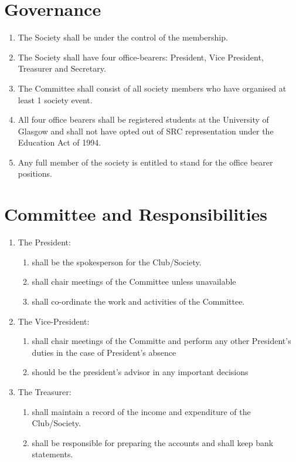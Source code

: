 \documentclass{report}
\newcommand{\bearersNo}{four}
\begin{document}
\section{Governance}

	\begin{enumerate}
		\item{The Society shall be under the control of the membership.}
		\item{The Society shall have \bearersNo{} office-bearers: President, Vice President, Treasurer and Secretary.}
		\item{The Committee shall consist of all society members who have organised at least 1 society event.}
		\item{All \bearersNo{} office bearers shall be registered students at the University of Glasgow and shall not have opted out of SRC representation under the Education Act of 1994.}
		\item{Any full member of the society is entitled to stand for the office bearer positions.}
	\end{enumerate}
	
\section{Committee and Responsibilities}

	\begin{enumerate}
		\item{The President:
			\begin{enumerate}
				\item{shall be the spokesperson for the Club/Society.}
				\item{shall chair meetings of the Committee unless unavailable }
				\item{shall co-ordinate the work and activities of the Committee.}
			\end{enumerate}
		}
		\item{The Vice-President:
			\begin{enumerate}
				\item{shall chair meetings of the Committe and perform any other President’s duties in the case of President's absence}
				\item{should be the president's advisor in any important decisions}
			\end{enumerate}
		}
		\item{The Treasurer:
			\begin{enumerate}
				\item{shall maintain a record of the income and expenditure of the Club/Society.}
				\item{shall be responsible for preparing the accounts and shall keep bank statements.}
			\end{enumerate}
		}
	\end{enumerate}
\end{document}
